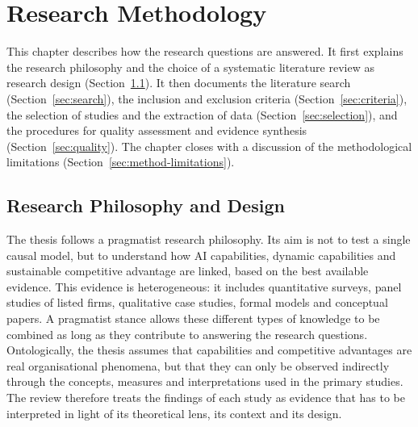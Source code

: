 
\chapter{Research Methodology}
\label{ch:methodology}

This chapter describes how the research questions are answered. It first explains the research philosophy and the choice of a systematic literature review as research design (Section~\ref{sec:design}). It then documents the literature search (Section~\ref{sec:search}), the inclusion and exclusion criteria (Section~\ref{sec:criteria}), the selection of studies and the extraction of data (Section~\ref{sec:selection}), and the procedures for quality assessment and evidence synthesis (Section~\ref{sec:quality}). The chapter closes with a discussion of the methodological limitations (Section~\ref{sec:method-limitations}).

\section{Research Philosophy and Design}
\label{sec:design}

The thesis follows a pragmatist research philosophy. Its aim is not to test a single causal model, but to understand how AI capabilities, dynamic capabilities and sustainable competitive advantage are linked, based on the best available evidence. This evidence is heterogeneous: it includes quantitative surveys, panel studies of listed firms, qualitative case studies, formal models and conceptual papers. A pragmatist stance allows these different types of knowledge to be combined as long as they contribute to answering the research questions. Ontologically, the thesis assumes that capabilities and competitive advantages are real organisational phenomena, but that they can only be observed indirectly through the concepts, measures and interpretations used in the primary studies. The review therefore treats the findings of each study as evidence that has to be interpreted in light of its theoretical lens, its context and its design.


